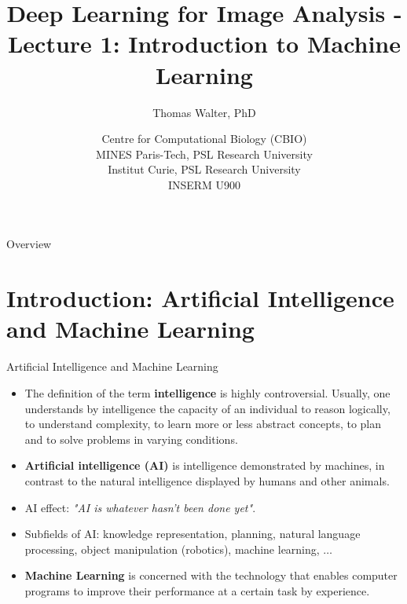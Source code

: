 \documentclass[xcolor=pdftex,dvipsnames,table]{beamer}
\title{Deep Learning for Image Analysis - \\
	   Lecture 1: Introduction to Machine Learning}
\author{Thomas Walter, PhD}
\date{Centre for Computational Biology (CBIO) \\
	  MINES Paris-Tech, PSL Research University \\
	  Institut Curie, PSL Research University \\
	  INSERM U900}
\begin{document}
\begin{frame}
\titlepage
\end{frame}

\begin{frame}{Overview}
\tableofcontents
\end{frame}

\section{Introduction: Artificial Intelligence and Machine Learning}

\begin{frame}{Artificial Intelligence and Machine Learning}
\begin{itemize}
	\item The definition of the term \textbf{intelligence} is highly controversial. Usually, one understands by intelligence the capacity of an individual to reason logically, to understand complexity, to learn more or less abstract concepts, to plan and to solve problems in varying conditions.
	\item \textbf{Artificial intelligence (AI)} is intelligence demonstrated by machines, in contrast to the natural intelligence displayed by humans and other animals.
	\item AI effect: \emph{"AI is whatever hasn't been done yet"}.
	\item Subfields of AI: knowledge representation, planning, natural language processing, object manipulation (robotics), machine learning, $\ldots$
	\item \textbf{Machine Learning} is concerned with the technology that enables computer programs to improve their performance at a certain task by experience.
\end{itemize}
\end{frame}
\end{document}
